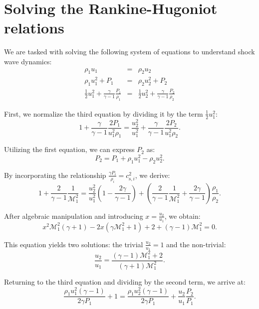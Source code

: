 \section{Solving the Rankine-Hugoniot relations}

We are tasked with solving the following system of equations to understand shock wave dynamics:
%
\begin{eqnarray}
\rho_1 u_1 & = & \rho_2 u_2 \\
\rho_1 u_1^2 + P_1 & = & \rho_2 u_2^2 + P_2 \\
\frac{1}{2} u_1^2 + \frac{\gamma}{\gamma - 1} \frac{P_1}{\rho_1} & = & \frac{1}{2} u_2^2 + \frac{\gamma}{\gamma - 1} \frac{P_2}{\rho_2}
\end{eqnarray}

First, we normalize the third equation by dividing it by the term \( \frac{1}{2} u_1^2 \):
%
\begin{equation}
1 + \frac{\gamma}{\gamma - 1} \frac{2 P_1}{u_1^2 \rho_1} = \frac{u_2^2}{u_1^2} + \frac{\gamma}{\gamma - 1}  \frac{2 P_2}{u_1^2 \rho_2}.
\end{equation}

Utilizing the first equation, we can express \( P_2 \) as:
%
\begin{equation}
P_2 = P_1 + \rho_1 u_1^2 - \rho_2 u_2^2.
\end{equation}

By incorporating the relationship \( \frac{\gamma P_i}{\rho_i} = c_{\text{s}, i}^2 \), we derive:
%
\begin{equation}
1 + \frac{2}{\gamma - 1} \frac{1}{\mathcal{M}_1^2} = \frac{u_2^2}{u_1^2} \left(1 - \frac{2\gamma}{\gamma - 1} \right) + \left( \frac{2}{\gamma - 1}  \frac{1}{\mathcal{M}_1^2} + \frac{2\gamma}{\gamma - 1} \right) \frac{\rho_1}{\rho_2}.
\end{equation}

After algebraic manipulation and introducing \( x = \frac{u_2}{u_1} \), we obtain:
%
\[
x^2 \mathcal{M}_1^2 (\gamma + 1) - 2x (\gamma \mathcal{M}_1^2 + 1) + 2 + (\gamma - 1) \mathcal{M}_1^2 = 0.
\]

This equation yields two solutions: the trivial \( \frac{u_2}{u_1} = 1 \) and the non-trivial:
%
\[
\frac{u_2}{u_1} = \frac{(\gamma - 1) \mathcal{M}_1^2 + 2}{(\gamma + 1) \mathcal{M}_1^2}.
\]

Returning to the third equation and dividing by the second term, we arrive at:
%
\[
\frac{\rho_1 u_1^2 (\gamma - 1)}{2 \gamma P_1} + 1 = \frac{\rho_1 u_2^2 (\gamma - 1)}{2 \gamma P_1} + \frac{u_2}{u_1}\frac{P_2}{P_1}.
\]

